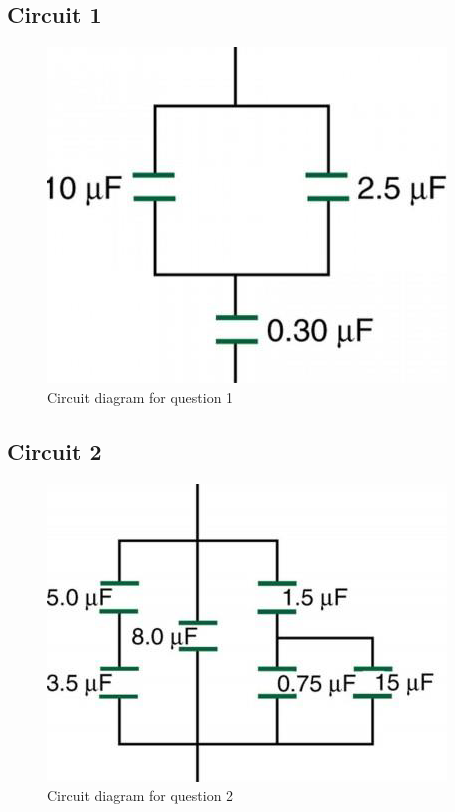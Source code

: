 \documentclass[titlepage]{article}
\begin{document}
    	\subsection{Circuit 1}

        \FloatBarrier
        \begin{figure}[hbt!]
            \centering
            \caption{Circuit diagram for question 1}
            \includegraphics{questions/1}
        \end{figure}
        \FloatBarrier



    
    	\subsection{Circuit 2}
        \FloatBarrier
        \begin{figure}[hbt!]
            \centering
            \caption{Circuit diagram for question 2}
            \includegraphics{questions/2}
        \end{figure}
        \FloatBarrier
\end{document}
